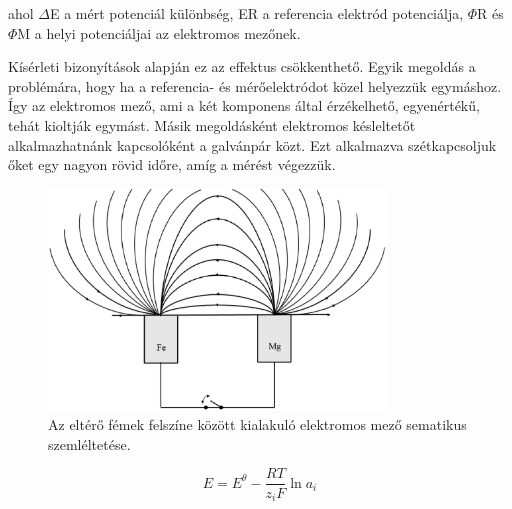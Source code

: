 ahol $\Delta$E a mért potenciál különbség, ER a referencia elektród potenciálja, $\Phi$R és $\Phi$M a helyi potenciáljai az elektromos mezőnek. 

Kísérleti bizonyítások alapján ez az effektus csökkenthető. Egyik megoldás a problémára, hogy ha a referencia- és mérőelektródot közel helyezzük egymáshoz. Így az elektromos mező, ami a két komponens által érzékelhető, egyenértékű, tehát kioltják egymást. Másik megoldásként elektromos késleltetőt alkalmazhatnánk kapcsolóként a galvánpár közt. Ezt alkalmazva szétkapcsoljuk őket egy nagyon rövid időre, amíg a mérést végezzük.

\begin{figure}
\centering
\includegraphics[width=0.8\textwidth]{img/field.eps}
\caption{Az eltérő fémek felszíne között kialakuló elektromos mező sematikus szemléltetése.}
\label{fig:field}
\end{figure}


\begin{equation}
E = E^\theta - \frac{RT}{z_iF}\ln a_i
\end{equation}

